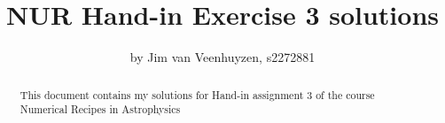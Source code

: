 \documentclass[a4paper,10pt]{article}
\title{NUR Hand-in Exercise 3 solutions}
\author{by Jim van Veenhuyzen, s2272881}
\begin{document}
\maketitle

\begin{abstract}
This document contains my solutions for Hand-in assignment 3 of the course Numerical Recipes in Astrophysics
\end{abstract}


\end{document}
